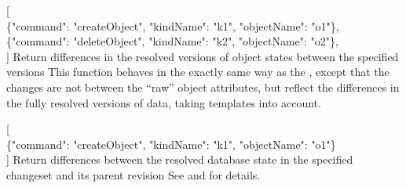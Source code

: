 \documentclass{article}
\begin{document}
    {[ \\
    \{"command": "createObject", "kindName": "k1", "objectName": "o1"\}, \\
    \{"command": "deleteObject", "kindName": "k2", "objectName": "o2"\}, \\
    ]}
    {Return differences in the resolved versions of object states between the specified versions}
    {This function behaves in the exactly same way as the , except that the changes are not
    between the ``raw'' object attributes, but reflect the differences in the fully resolved versions of data, taking
    templates  into account.}

    {[ \\
    \{"command": "createObject", "kindName": "k1", "objectName": "o1"\} \\
    ]}
    {Return differences between the resolved database state in the specified changeset and its parent revision}
    {See  and  for details.}
\end{document}
